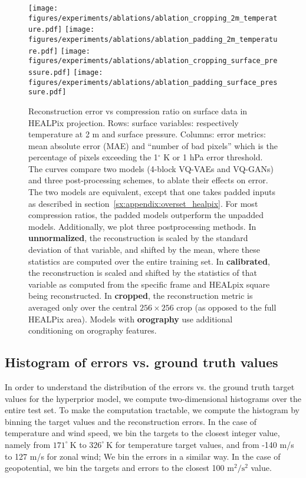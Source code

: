 \documentclass[11pt, a4paper, logo, copyright, numbering]{googledeepmind}
\begin{document}
\begin{figure}
    \centering
        \texttt{[image: figures/experiments/ablations/ablation\_cropping\_2m\_temperature.pdf]}
        \texttt{[image: figures/experiments/ablations/ablation\_padding\_2m\_temperature.pdf]}
        \texttt{[image: figures/experiments/ablations/ablation\_cropping\_surface\_pressure.pdf]}
        \texttt{[image: figures/experiments/ablations/ablation\_padding\_surface\_pressure.pdf]}
    \caption{Reconstruction error vs compression ratio on surface data in HEALPix projection. Rows: surface variables: respectively temperature at 2 m and surface pressure. Columns: error metrics: mean absolute error (MAE) and ``number of bad pixels'' which is the percentage of pixels exceeding the 1$^\circ$ K or 1 hPa error threshold. The curves compare two models (4-block VQ-VAEs and VQ-GANs) and three post-processing schemes, to ablate their effects on error. The two models are equivalent, except that one takes padded inputs as described in section~\ref{sx:appendix:overset_healpix}. For most compression ratios, the padded models outperform the unpadded models. Additionally, we plot three postprocessing methods. In \textbf{unnormalized}, the reconstruction is scaled by the standard deviation of that variable, and shifted by the mean, where these statistics are computed over the entire training set. In \textbf{calibrated}, the reconstruction is scaled and shifted by the statistics of that variable as computed from the specific frame and HEALpix square being reconstructed. In \textbf{cropped}, the reconstruction metric is averaged only over the central $256 \times 256$ crop (as opposed to the full HEALPix area). Models with \textbf{orography} use additional conditioning on orography features.}
\label{fig:ablate_pad_and_postprocess}
\end{figure}

\subsection{Histogram of errors vs. ground truth values}
\label{sx:appendix:hist2d-err-value}

In order to understand the distribution of the errors vs. the ground truth target values for the hyperprior model, we compute two-dimensional histograms over the entire test set. To make the computation tractable, we compute the histogram by binning the target values and the reconstruction errors. In the case of temperature and wind speed, we bin the targets to the closest integer value, namely from $171^\circ~\text{K}$ to $326^\circ~\text{K}$ for temperature target values, and from -140 m/s to 127 m/s for zonal wind; We bin the errors in a similar way. In the case of geopotential, we bin the targets and errors to the closest 100 $\text{m}^2/\text{s}^2$ value.
\end{document}
